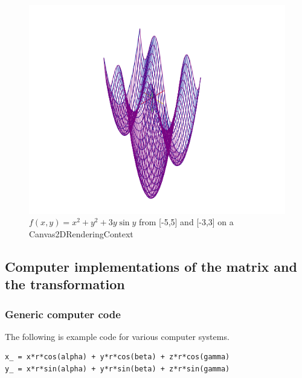 \documentclass[a4paper]{article}
\begin{document}
\begin{Theorem}
\begin{figure}[ht]
\includegraphics[scale=0.5]{fxyplot.png}
\caption{$f(x,y) = x^2 + y^2 + 3y \sin y$ from [-5,5] and [-3,3] on a Canvas2DRenderingContext}
\end{figure}


\end{Theorem}

\subsection{Computer implementations of the matrix and the transformation}
\subsubsection{Generic computer code}
\begin{example}
The following is example code for various computer systems.\\
\begin{lstlisting}
x_ = x*r*cos(alpha) + y*r*cos(beta) + z*r*cos(gamma)
y_ = x*r*sin(alpha) + y*r*sin(beta) + z*r*sin(gamma)
\end{lstlisting}
\end{example}\\
\end{document}
